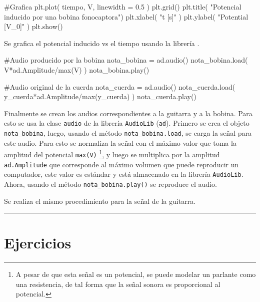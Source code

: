 \begin{listing}[style=python, numbers = none]
#Grafica
plt.plot( tiempo, V, linewidth = 0.5 )
plt.grid()
plt.title( "Potencial inducido por una bobina fonocaptora")
plt.xlabel( "t [s]" )
plt.ylabel( "Potential [V_0]" )
plt.show()
\end{listing}
Se grafica el potencial inducido vs el tiempo usando la librería 
\matplotlib.


\begin{listing}[style=python, numbers = none]
#Audio producido por la bobina
nota_bobina = ad.audio()
nota_bobina.load( V*ad.Amplitude/max(V) )
nota_bobina.play()

#Audio original de la cuerda
nota_cuerda = ad.audio()
nota_cuerda.load( y_cuerda*ad.Amplitude/max(y_cuerda) )
nota_cuerda.play()
\end{listing}
Finalmente se crean los audios correspondientes a la guitarra y a la bobina.
Para esto se usa la clase \texttt{audio} de la librería \texttt{AudioLib} 
(\texttt{ad}). Primero se crea el objeto \texttt{nota\_bobina}, luego, usando
el método \texttt{nota\_bobina.load}, se carga la señal para este audio.
Para esto se normaliza la señal con el máximo valor que toma la amplitud del
potencial \texttt{max(V)} \footnote{A pesar de que esta señal es un potencial,
se puede modelar un parlante como una resistencia, de tal forma que la señal
sonora es proporcional al potencial.}, y luego se multiplica por la amplitud
\texttt{ad.Amplitude} que corresponde al máximo volumen que puede reproducir
un computador, este valor es estándar y está almacenado en la librería 
\texttt{AudioLib}. Ahora, usando el método \texttt{nota\_bobina.play()} se
reproduce el audio.

Se realiza el mismo procedimiento para la señal de la guitarra.


\rule{14cm}{0.5mm}


\section{Ejercicios}
\label{sec:ejercicios}

